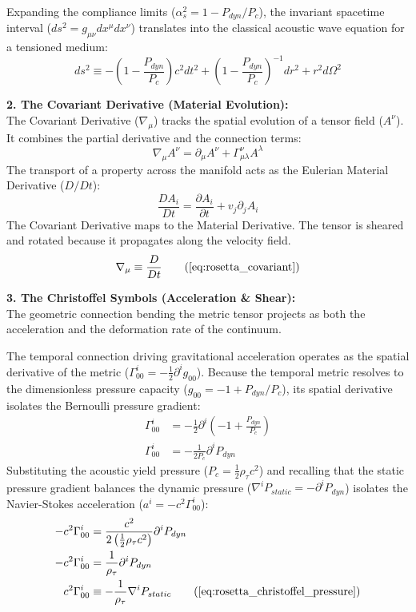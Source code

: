 Expanding the compliance limits ($\alpha_s^2 = 1 - P_{dyn}/P_c$), the invariant spacetime interval ($ds^2 = g_{\mu\nu} dx^\mu dx^\nu$) translates into the classical acoustic wave equation for a tensioned medium:
\begin{equation}
    ds^2 \equiv -\left( 1 - \frac{P_{dyn}}{P_c} \right) c^2 dt^2 + \left( 1 - \frac{P_{dyn}}{P_c} \right)^{-1} dr^2 + r^2 d\Omega^2 \label{eq:rosetta_acoustic_metric}
\end{equation}

\textbf{2. The Covariant Derivative (Material Evolution):} \\
The Covariant Derivative ($\nabla_\mu$) tracks the spatial evolution of a tensor field ($A^\nu$). It combines the partial derivative and the connection terms:
\begin{equation}
    \nabla_\mu A^\nu = \partial_\mu A^\nu + \Gamma^\nu_{\mu\lambda} A^\lambda 
\end{equation}
The transport of a property across the manifold acts as the Eulerian Material Derivative ($D/Dt$):
\begin{equation}
    \frac{D A_i}{Dt} = \frac{\partial A_i}{\partial t} + v_j \partial_j A_i 
\end{equation}
The Covariant Derivative maps to the Material Derivative. The tensor is sheared and rotated because it propagates along the velocity field.
\begin{equation}
    \nabla_\mu \equiv \frac{D}{Dt} \tag{\ref{eq:rosetta_covariant}}
\end{equation}

\textbf{3. The Christoffel Symbols (Acceleration \& Shear):} \\
The geometric connection bending the metric tensor projects as both the acceleration and the deformation rate of the continuum. 

The temporal connection driving gravitational acceleration operates as the spatial derivative of the metric ($\Gamma^i_{00} = -\frac{1}{2}\partial^i g_{00}$). Because the temporal metric resolves to the dimensionless pressure capacity ($g_{00} = -1 + P_{dyn}/P_c$), its spatial derivative isolates the Bernoulli pressure gradient: 
\begin{align}
    \Gamma^i_{00} &= -\frac{1}{2}\partial^i \left( -1 + \frac{P_{dyn}}{P_c} \right) \nonumber \\
    \Gamma^i_{00} &= -\frac{1}{2 P_c} \partial^i P_{dyn} \nonumber
\end{align}
Substituting the acoustic yield pressure ($P_c = \frac{1}{2}\rho_{\tau} c^2$) and recalling that the static pressure gradient balances the dynamic pressure ($\nabla^i P_{static} = -\partial^i P_{dyn}$) isolates the Navier-Stokes acceleration ($a^i = -c^2 \Gamma^i_{00}$):
\begin{align}
    -c^2 \Gamma^i_{00} &= \frac{c^2}{2 \left(\frac{1}{2}\rho_{\tau} c^2\right)} \partial^i P_{dyn} \nonumber \\
    -c^2 \Gamma^i_{00} &= \frac{1}{\rho_{\tau}} \partial^i P_{dyn} \nonumber \\
    c^2 \Gamma^i_{00} &\equiv -\frac{1}{\rho_{\tau}} \nabla^i P_{static} \tag{\ref{eq:rosetta_christoffel_pressure}}
\end{align}

